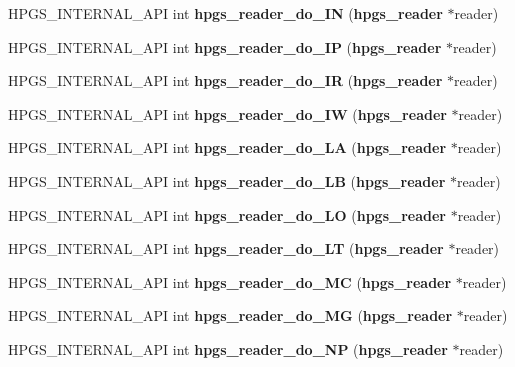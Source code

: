 \begin{DoxyCompactItemize}
\item 
HPGS\_\-INTERNAL\_\-API int {\bfseries hpgs\_\-reader\_\-do\_\-IN} ({\bf hpgs\_\-reader} $\ast$reader)\label{group__reader_ga90d43ae4088c31f4410741183d965473}

\item 
HPGS\_\-INTERNAL\_\-API int {\bfseries hpgs\_\-reader\_\-do\_\-IP} ({\bf hpgs\_\-reader} $\ast$reader)\label{group__reader_gab6d0c05663530d5753aa01d5175fe812}

\item 
HPGS\_\-INTERNAL\_\-API int {\bfseries hpgs\_\-reader\_\-do\_\-IR} ({\bf hpgs\_\-reader} $\ast$reader)\label{group__reader_ga58b821f02eea2f09c87eae16d12a65cf}

\item 
HPGS\_\-INTERNAL\_\-API int {\bfseries hpgs\_\-reader\_\-do\_\-IW} ({\bf hpgs\_\-reader} $\ast$reader)\label{group__reader_ga7d959866078c4b03f7a59e12a23f4584}

\item 
HPGS\_\-INTERNAL\_\-API int {\bfseries hpgs\_\-reader\_\-do\_\-LA} ({\bf hpgs\_\-reader} $\ast$reader)\label{group__reader_gac0dda452214e934618ee2c81006c0841}

\item 
HPGS\_\-INTERNAL\_\-API int {\bfseries hpgs\_\-reader\_\-do\_\-LB} ({\bf hpgs\_\-reader} $\ast$reader)\label{group__reader_ga7a3fa037ff8e75768e32bc8c6608c735}

\item 
HPGS\_\-INTERNAL\_\-API int {\bfseries hpgs\_\-reader\_\-do\_\-LO} ({\bf hpgs\_\-reader} $\ast$reader)\label{group__reader_gaf64432ba4e6d044698f624df106db95b}

\item 
HPGS\_\-INTERNAL\_\-API int {\bfseries hpgs\_\-reader\_\-do\_\-LT} ({\bf hpgs\_\-reader} $\ast$reader)\label{group__reader_ga82887bdfcf93658b4f7760cca796daf3}

\item 
HPGS\_\-INTERNAL\_\-API int {\bfseries hpgs\_\-reader\_\-do\_\-MC} ({\bf hpgs\_\-reader} $\ast$reader)\label{group__reader_ga1d5faab281e509d8f1ae6218e8e40667}

\item 
HPGS\_\-INTERNAL\_\-API int {\bfseries hpgs\_\-reader\_\-do\_\-MG} ({\bf hpgs\_\-reader} $\ast$reader)\label{group__reader_ga5e8e8febb5e02732d913ff5f4e1334c2}

\item 
HPGS\_\-INTERNAL\_\-API int {\bfseries hpgs\_\-reader\_\-do\_\-NP} ({\bf hpgs\_\-reader} $\ast$reader)\label{group__reader_gafc2f2f2942ece9cdb6b78e77162ff769}


\end{DoxyCompactItemize}
